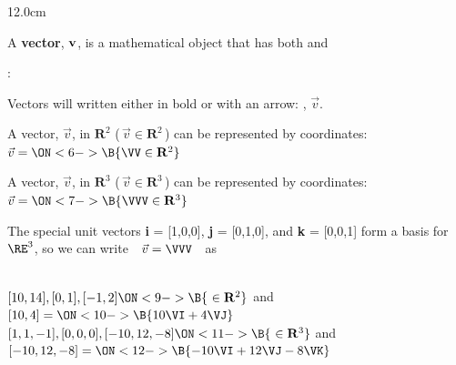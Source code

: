 \begin{frame}
\frametitle{}
\scriptsize
\begin{columns}
\begin{column}{12.0cm}
	
	\DEF A {\bf vector}, ${\bf v}$, is a mathematical object that has both  and \ON<3->{\B{\quad direction.}}

\vspace{0.3cm}

: \\

\vspace{0.2cm}

\OBUL  Vectors will written either in bold or with an arrow: , $\vec{v}$.\\

\vspace{0.2cm}

\OBUL  A vector, $\vec{v}$, in $\mathbf{R}^2$ (\,$\vec{v} \in \mathbf{R}^2$\,) can be represented by  coordinates: \quad $\vec{v} = \ON<6->{\B{\VV \in \mathbf{R}^2}}$\\

\vspace{0.2cm}

\OBUL  A vector, $\vec{v}$, in $\mathbf{R}^3$ (\,$\vec{v} \in \mathbf{R}^3$\,) can be represented by  coordinates: \quad $\vec{v} = \ON<7->{\B{\VVV \in \mathbf{R}^3}}$\\

\vspace{0.2cm}

\OBUL  The special unit vectors {\bf i} = [1,0,0], {\bf j} = [0,1,0], and {\bf k} = [0,0,1] form a basis for $\RE^3$, \NEWLINE so we can write \,\, $\vec{v} = \VVV$ \,\, as \,\, 

\vspace{0.3cm}

\EX \\
\vspace{0.1cm}
\OBUL $[10,14], [0,1], [-1,2] \ON<9->{\B{\,\, \in \mathbf{R}^2}}$ \quad and \quad $[10,4] = \ON<10->{\B{10\VI + 4 \VJ}}$\\
\vspace{0.2cm}
\OBUL $[1,1,-1], [0,0,0], [-10,12,-8] \ON<11->{\B{\,\, \in \mathbf{R}^3}}$ \quad and \quad $[-10,12,-8] = \ON<12->{\B{-10\VI + 12 \VJ - 8\VK}}$\\


\end{column}
\end{columns}
\end{frame}
